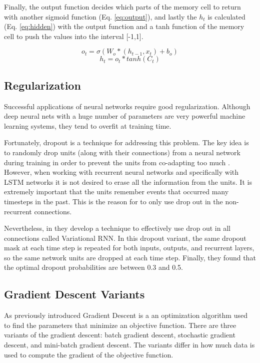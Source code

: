 Finally, the output function decides which parts of the memory cell to return with another sigmoid function (Eq. \ref{eq:output}), and lastly the $h_t$ is calculated (Eq. \ref{eq:hidden}) with the output function and a tanh function of the memory cell to push the values into the interval [-1,1].

\begin{equation} \label{eq:output}
o_t=\sigma(W_o*(h_{t-1},x_t)+b_o)
\end{equation}
\begin{equation} \label{eq:hidden}
h_t=o_t*tanh(C_t)
\end{equation}

\subsection{Regularization}

Successful applications of neural networks require good regularization. Although deep neural nets with a huge number of parameters are very powerful machine learning systems, they tend to overfit at training time. 

Fortunately, dropout is a technique for addressing this problem. The key idea is to randomly drop units (along with their connections) from a neural network during training in order to prevent the units from co-adapting too much \cite{srivastava2013improving}. However, when working with recurrent neural networks and specifically with LSTM networks it is not desired to erase all the information from the units. It is extremely important that the units remember events that occurred many timesteps in the past. This is the reason for \cite{zaremba2014recurrent} to only use drop out in the non-recurrent connections. 

Nevertheless, in \cite{gal2015theoretically} they develop a technique to effectively use drop out in all connections called Variational RNN. In this dropout variant, the same dropout mask at each time step is repeated for both inputs, outputs, and recurrent layers, so the same network units are dropped at each time step. 
Finally, they found that the optimal dropout probabilities are between 0.3 and 0.5.

\subsection{Gradient Descent Variants}
As previously introduced Gradient Descent is a an optimization algorithm used to find the parameters that minimize an objective function. There are three variants of the gradient descent: batch gradient descent, stochastic gradient descent, and mini-batch gradient descent. The variants differ in how much data is used to compute the gradient of the objective function. 

